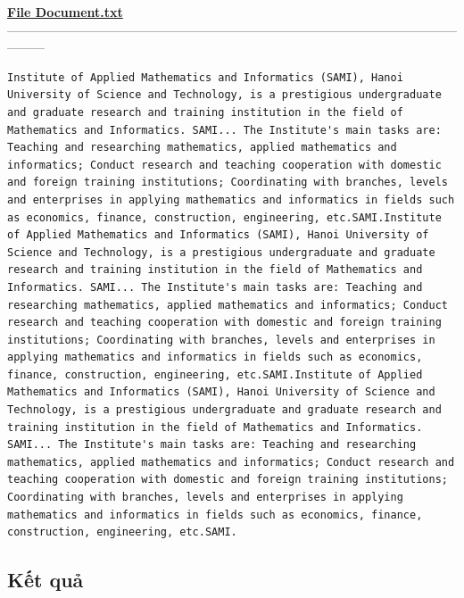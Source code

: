 \documentclass[12pt,a4paper]{article}
\begin{document}
\underline{\textbf{File Document.txt}} \\[0.5cm]
---------------------------------------------------------------------------------------------------------------------
\begin{lstlisting}
Institute of Applied Mathematics and Informatics (SAMI), Hanoi University of Science and Technology, is a prestigious undergraduate and graduate research and training institution in the field of Mathematics and Informatics. SAMI... The Institute's main tasks are: Teaching and researching mathematics, applied mathematics and informatics; Conduct research and teaching cooperation with domestic and foreign training institutions; Coordinating with branches, levels and enterprises in applying mathematics and informatics in fields such as economics, finance, construction, engineering, etc.SAMI.Institute of Applied Mathematics and Informatics (SAMI), Hanoi University of Science and Technology, is a prestigious undergraduate and graduate research and training institution in the field of Mathematics and Informatics. SAMI... The Institute's main tasks are: Teaching and researching mathematics, applied mathematics and informatics; Conduct research and teaching cooperation with domestic and foreign training institutions; Coordinating with branches, levels and enterprises in applying mathematics and informatics in fields such as economics, finance, construction, engineering, etc.SAMI.Institute of Applied Mathematics and Informatics (SAMI), Hanoi University of Science and Technology, is a prestigious undergraduate and graduate research and training institution in the field of Mathematics and Informatics. SAMI... The Institute's main tasks are: Teaching and researching mathematics, applied mathematics and informatics; Conduct research and teaching cooperation with domestic and foreign training institutions; Coordinating with branches, levels and enterprises in applying mathematics and informatics in fields such as economics, finance, construction, engineering, etc.SAMI.
\end{lstlisting}

\subsection{Kết quả}
\end{document}
